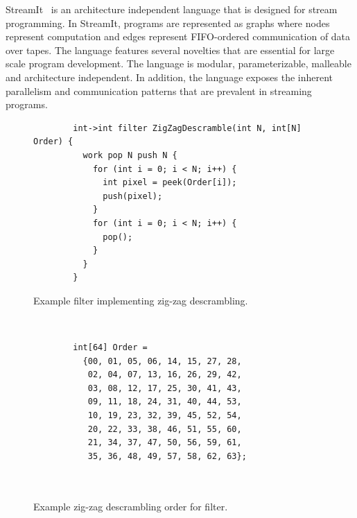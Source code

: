 \label{sec:streamit}

StreamIt~\cite{streamitcc} is an architecture independent language
that is designed for stream programming. In StreamIt, programs are
represented as graphs where nodes represent computation and edges
represent FIFO-ordered communication of data over tapes. The language
features several novelties that are essential for large scale program
development. The language is modular, parameterizable, malleable and
architecture independent. In addition, the language exposes the
inherent parallelism and communication patterns that are prevalent in
streaming programs.

\begin{figure}[t]
  \begin{minipage}[t]{4.0in}
    {
	\begin{scriptsize}
	  \begin{verbatim}
	    int->int filter ZigZagDescramble(int N, int[N] Order) {
	      work pop N push N {
	        for (int i = 0; i < N; i++) {
	          int pixel = peek(Order[i]);
	          push(pixel);
	        }
	        for (int i = 0; i < N; i++) {
	          pop();
	        }
	      }
	    }
	  \end{verbatim}
	\end{scriptsize}
    }
    \caption{Example filter implementing zig-zag descrambling.}
    \label{fig:zigzag-filter}
  \end{minipage}
  ~~\vrule~~
  \begin{minipage}[t]{3.0in}
    {
	\begin{scriptsize}
	  \begin{verbatim}
	    int[64] Order =
	      {00, 01, 05, 06, 14, 15, 27, 28,
	       02, 04, 07, 13, 16, 26, 29, 42,
	       03, 08, 12, 17, 25, 30, 41, 43,
	       09, 11, 18, 24, 31, 40, 44, 53,
	       10, 19, 23, 32, 39, 45, 52, 54,
	       20, 22, 33, 38, 46, 51, 55, 60,
	       21, 34, 37, 47, 50, 56, 59, 61,
	       35, 36, 48, 49, 57, 58, 62, 63};



	  \end{verbatim}
	\end{scriptsize}
    }
    \caption{Example zig-zag descrambling order for filter.}
    \label{fig:zigzag-order}
  \end{minipage}
\end{figure}

